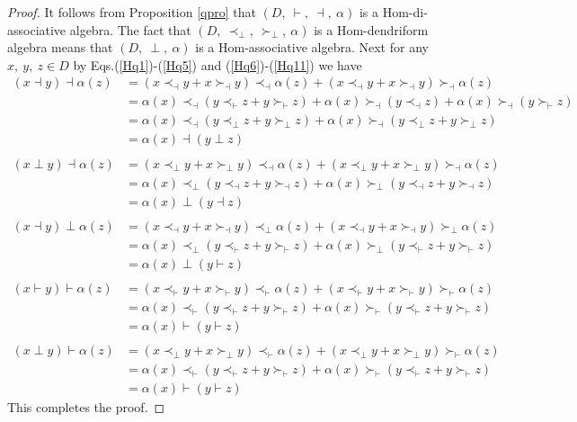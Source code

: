 \documentclass[11pt,twoside,reqno]{amsart}
\theoremstyle{plain}
\theoremstyle{definition}
\begin{document}
\begin{proof}
It follows from Proposition \ref{qpro}  that $(D,\  \vdash,\  \dashv,\  \alpha)$ is a Hom-di-associative algebra. The fact
 that $(D ,\ \prec_\perp ,\  \succ_\perp,\  \alpha)$ is a Hom-dendriform algebra means that $(D,\  \perp,\  \alpha)$ is a Hom-associative algebra. Next  for any $x,\ y,\  z \in D$  
by Eqs.(\ref{Hq1})-(\ref{Hq5}) and (\ref{Hq6})-(\ref{Hq11})  we have
 \begin{align*}
(x \dashv y) \dashv \alpha(z)
&= (x \prec_\dashv y + x \succ_\dashv y) \prec_\dashv \alpha(z) + (x \prec_\dashv y + x \succ_\dashv y) \succ_\dashv \alpha(z) \\
&= \alpha(x) \prec_\dashv (y \prec_\vdash z + y \succ_\vdash z) + \alpha(x) \succ_\dashv (y \prec_\dashv z) + \alpha(x) \succ_\dashv (y \succ_\vdash z) \\
&= \alpha(x) \prec_\dashv (y \prec_\perp z + y \succ_\perp z) + \alpha(x) \succ_\dashv (y \prec_\perp z + y \succ_\perp z) \\
&= \alpha(x) \dashv (y \perp z) \\
\\
(x \perp y) \dashv \alpha(z)
&= (x \prec_\perp y + x \succ_\perp y) \prec_\dashv \alpha(z) + (x \prec_\perp y + x \succ_\perp y) \succ_\dashv \alpha(z) \\
&= \alpha(x) \prec_\perp (y \prec_\dashv z + y \succ_\dashv z) + \alpha(x) \succ_\perp (y \prec_\dashv z + y \succ_\dashv z) \\
&= \alpha(x) \perp (y \dashv z) \\
\\
(x \dashv y) \perp \alpha(z)
&= (x \prec_\dashv y + x \succ_\dashv y) \prec_\perp \alpha(z) + (x \prec_\dashv y + x \succ_\dashv y) \succ_\perp \alpha(z) \\
&= \alpha(x) \prec_\perp (y \prec_\vdash z + y \succ_\vdash z) + \alpha(x) \succ_\perp (y \prec_\vdash z + y \succ_\vdash z) \\
&= \alpha(x) \perp (y \vdash z) \\
\\
(x \vdash y) \vdash \alpha(z)
&= (x \prec_\vdash y + x \succ_\vdash y) \prec_\vdash \alpha(z) + (x \prec_\vdash y + x \succ_\vdash y) \succ_\vdash \alpha(z) \\
&= \alpha(x) \prec_\vdash (y \prec_\vdash z + y \succ_\vdash z) + \alpha(x) \succ_\vdash (y \prec_\vdash z + y \succ_\vdash z) \\
&= \alpha(x) \vdash (y \vdash z) \\
\\
(x \perp y) \vdash \alpha(z)
&= (x \prec_\perp y + x \succ_\perp y) \prec_\vdash \alpha(z) + (x \prec_\perp y + x \succ_\perp y) \succ_\vdash \alpha(z) \\
&= \alpha(x) \prec_\vdash (y \prec_\vdash z + y \succ_\vdash z) + \alpha(x) \succ_\vdash (y \prec_\vdash z + y \succ_\vdash z) \\
&= \alpha(x) \vdash (y \vdash z)
\end{align*}
This completes the proof.
\end{proof}
\end{document}
